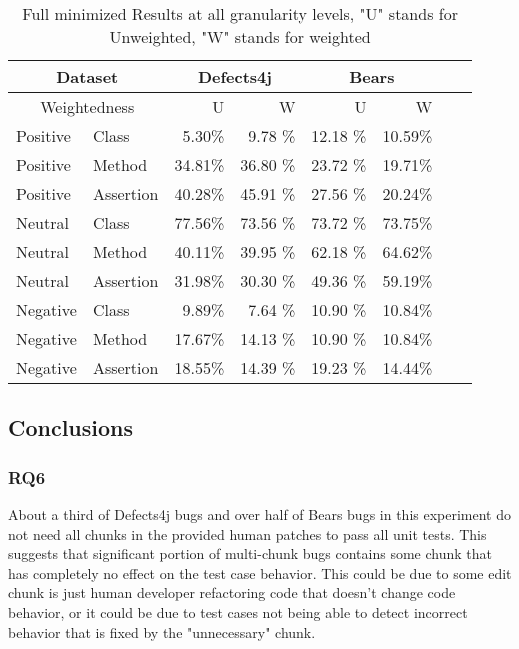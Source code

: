 \documentclass[sigconf, timestamp-false, anonymous=true]{acmart}
\begin{document}
\begin{table}
{\begin{center}
\begin{tabular}{| l | l | r | r | r | r | r | r |}
\hline
\multicolumn{2}{|c|}{Dataset} &\multicolumn{2}{|c|}{Defects4j} & \multicolumn{2}{|c|}{Bears} \\
\hline
\multicolumn{2}{|c|}{Weightedness} & U & W & U & W  \\
\hline
Positive & Class & 5.30\% & 9.78 \% & 12.18 \% & 10.59\%  \\
Positive & Method & 34.81\% & 36.80 \% & 23.72 \% & 19.71\%  \\
Positive & Assertion & 40.28\% & 45.91 \% & 27.56 \% & 20.24\%  \\ 
\hline
Neutral & Class & 77.56\% & 73.56 \% & 73.72 \% & 73.75\% \\
Neutral & Method & 40.11\% & 39.95 \% & 62.18 \% & 64.62\%  \\
Neutral & Assertion & 31.98\% & 30.30 \% & 49.36 \% &  59.19\%  \\ 
\hline
Negative & Class & 9.89\% & 7.64 \% & 10.90 \% & 10.84\%  \\
Negative & Method & 17.67\% & 14.13 \% & 10.90 \% & 10.84\%  \\
Negative & Assertion & 18.55\% & 14.39 \% & 19.23 \% &  14.44\%  \\ 
\hline
\end{tabular}
\end{center}}
\caption{Full minimized Results at all granularity levels, "U" stands for Unweighted, "W" stands for weighted}
\end{table}

    
\subsection{Conclusions}

\subsubsection{RQ6}
About a third of Defects4j bugs and over half of
Bears bugs in this experiment do not need all chunks in the provided human patches to pass
all unit tests. This suggests that significant portion of multi-chunk bugs contains some
chunk that has completely no effect on the test case behavior. This could be due to some
edit chunk is just human developer refactoring code that doesn't change code behavior,
or it could be due to test cases not being able to detect incorrect behavior that is fixed
by the "unnecessary" chunk.
\end{document}
